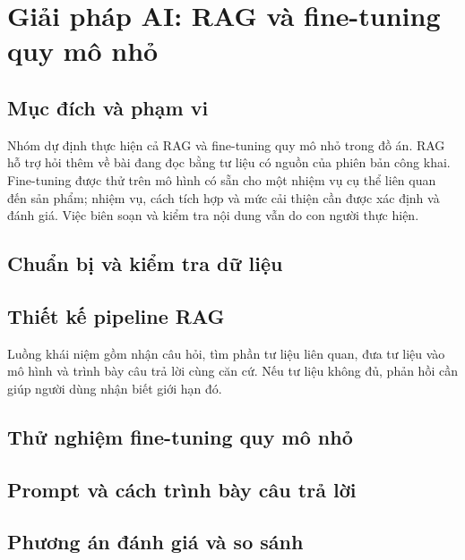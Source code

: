 \section{Giải pháp AI: RAG và fine-tuning quy mô nhỏ}
\label{sec:ai}

\subsection{Mục đích và phạm vi}
Nhóm dự định thực hiện cả RAG và fine-tuning quy mô nhỏ trong đồ án.
RAG hỗ trợ hỏi thêm về bài đang đọc bằng tư liệu có nguồn của phiên bản
công khai. Fine-tuning
được thử trên mô hình có sẵn cho một nhiệm vụ cụ thể liên quan đến sản
phẩm; nhiệm vụ, cách tích hợp và mức cải thiện cần được xác định và đánh
giá. Việc biên soạn và kiểm tra nội dung vẫn do con người thực hiện.

\subsection{Chuẩn bị và kiểm tra dữ liệu}
\par\noindent\mbox{}\par\vspace{2mm}

\subsection{Thiết kế pipeline RAG}
Luồng khái niệm gồm nhận câu hỏi, tìm phần tư liệu liên quan, đưa tư liệu
vào mô hình và trình bày câu trả lời cùng căn cứ. Nếu tư liệu không đủ,
phản hồi cần giúp người dùng nhận biết giới hạn đó.
\par\noindent\mbox{}\par\vspace{2mm}

\subsection{Thử nghiệm fine-tuning quy mô nhỏ}
\par\noindent\mbox{}\par\vspace{2mm}

\subsection{Prompt và cách trình bày câu trả lời}
\par\noindent\mbox{}\par\vspace{2mm}

\subsection{Phương án đánh giá và so sánh}
\par\noindent\mbox{}\par\vspace{2mm}

